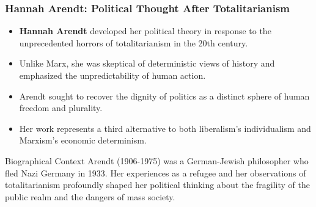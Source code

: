 \documentclass{beamer}
\begin{document}
\begin{frame}
\frametitle{Hannah Arendt: Political Thought After Totalitarianism}
\begin{itemize}
    \item \textbf{Hannah Arendt} developed her political theory in response to the unprecedented horrors of totalitarianism in the 20th century.
    \item Unlike Marx, she was skeptical of deterministic views of history and emphasized the unpredictability of human action.
    \item Arendt sought to recover the dignity of politics as a distinct sphere of human freedom and plurality.
    \item Her work represents a third alternative to both liberalism's individualism and Marxism's economic determinism.
\end{itemize}

\begin{exampleblock}{Biographical Context}
Arendt (1906-1975) was a German-Jewish philosopher who fled Nazi Germany in 1933. Her experiences as a refugee and her observations of totalitarianism profoundly shaped her political thinking about the fragility of the public realm and the dangers of mass society.
\end{exampleblock}
\end{frame}
\end{document}
